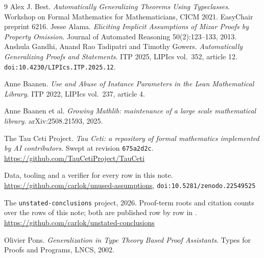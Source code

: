 \documentclass[11pt]{article}
\begin{document}
\small
\begin{thebibliography}{9}
\setlength{\itemsep}{0pt}\setlength{\parsep}{0pt}\setlength{\parskip}{0pt}
 Alex J. Best. \emph{Automatically Generalizing Theorems Using
Typeclasses}. Workshop on Formal Mathematics for Mathematicians, CICM 2021.
EasyChair preprint 6216.
 Jesse Alama. \emph{Eliciting Implicit Assumptions of Mizar
Proofs by Property Omission}. Journal of Automated Reasoning 50(2):123--133,
2013.
 Anshula Gandhi, Anand Rao Tadipatri and Timothy Gowers.
\emph{Automatically Generalizing Proofs and Statements}. ITP 2025, LIPIcs
vol.~352, article 12. \texttt{doi:10.4230/LIPIcs.ITP.2025.12}.

 Anne Baanen. \emph{Use and Abuse of Instance Parameters in
the Lean Mathematical Library}. ITP 2022, LIPIcs vol.~237, article 4.

 Anne Baanen et al. \emph{Growing Mathlib: maintenance of a
large scale mathematical library}. arXiv:2508.21593, 2025.

 The Tau Ceti Project. \emph{Tau Ceti: a repository of formal
mathematics implemented by AI contributors}. Swept at revision
\texttt{675a2d2c}. \url{https://github.com/TauCetiProject/TauCeti}

 Data, tooling and a verifier for every row in this note.
\url{https://github.com/carlok/unused-assumptions},
\texttt{doi:10.5281/zenodo.22549525}

 The \texttt{unstated-conclusions} project, 2026. Proof-term
roots and citation counts over the rows of this note; both are published row by
row in \cite{artifact}. \url{https://github.com/carlok/unstated-conclusions}

 Olivier Pons. \emph{Generalization in Type Theory Based Proof
Assistants}. Types for Proofs and Programs, LNCS, 2002.
\end{thebibliography}
\end{document}
